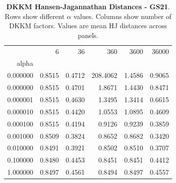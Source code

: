 \begin{table}[h]
\centering
\begin{tabular}{rrrrrr}
\toprule
 & 6 & 36 & 360 & 3600 & 36000 \\
alpha &  &  &  &  &  \\
\midrule
0.000000 & 0.8515 & 0.4712 & 208.4062 & 1.4586 & 0.9065 \\
0.000000 & 0.8515 & 0.4701 & 1.8671 & 1.4430 & 0.8471 \\
0.000001 & 0.8515 & 0.4630 & 1.3495 & 1.3414 & 0.6615 \\
0.000010 & 0.8515 & 0.4420 & 1.0553 & 1.0895 & 0.4609 \\
0.000100 & 0.8515 & 0.4194 & 0.9126 & 0.9239 & 0.3859 \\
0.001000 & 0.8509 & 0.3824 & 0.8652 & 0.8682 & 0.3420 \\
0.010000 & 0.8491 & 0.3921 & 0.8502 & 0.8510 & 0.3707 \\
0.100000 & 0.8480 & 0.4453 & 0.8451 & 0.8451 & 0.4412 \\
1.000000 & 0.8497 & 0.4561 & 0.8494 & 0.8497 & 0.4557 \\
\bottomrule
\end{tabular}
\caption{\textbf{DKKM Hansen-Jagannathan Distances - GS21}.
    Rows show different $\alpha$ values. Columns show number of DKKM factors.
    Values are mean HJ distances across panels.}
\label{tab:dkkm_hjd_gs21}

\end{table}
